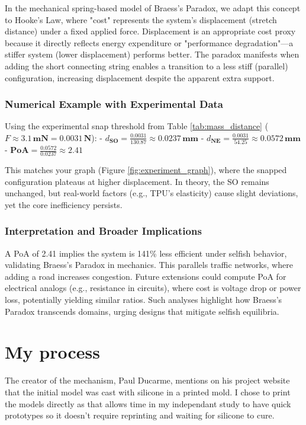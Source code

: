\documentclass[twocolumn]{article}
\begin{document}
In the mechanical spring-based model of Braess's Paradox, we adapt this concept to Hooke's Law, where "cost" represents the system's displacement (stretch distance) under a fixed applied force. Displacement is an appropriate cost proxy because it directly reflects energy expenditure or "performance degradation"—a stiffer system (lower displacement) performs better. The paradox manifests when adding the short connecting string enables a transition to a less stiff (parallel) configuration, increasing displacement despite the apparent extra support.


\subsubsection{Numerical Example with Experimental Data}
Using the experimental snap threshold from Table \ref{tab:mass_distance} (\(F \approx 3.1 \, \textbf{mN} = 0.0031 \, \textbf{N}\)):
- \(d_{\textbf{SO}} = \frac{0.0031}{130.87} \approx 0.0237 \, \textbf{mm}\)
- \(d_{\textbf{NE}} = \frac{0.0031}{54.25} \approx 0.0572 \, \textbf{mm}\)
- \(\textbf{PoA} = \frac{0.0572}{0.0237} \approx 2.41\)

This matches your graph (Figure \ref{fig:experiment_graph}), where the snapped configuration plateaus at higher displacement. In theory, the SO remains unchanged, but real-world factors (e.g., TPU's elasticity) cause slight deviations, yet the core inefficiency persists.

\subsubsection{Interpretation and Broader Implications}
A PoA of 2.41 implies the system is 141\% less efficient under selfish behavior, validating Braess's Paradox in mechanics. This parallels traffic networks, where adding a road increases congestion. Future extensions could compute PoA for electrical analogs (e.g., resistance in circuits), where cost is voltage drop or power loss, potentially yielding similar ratios. Such analyses highlight how Braess's Paradox transcends domains, urging designs that mitigate selfish equilibria.

\section{My process}

The creator of the mechanism, Paul Ducarme, mentions on his project website that the initial model was cast with silicone in a printed mold. I chose to print the models directly as that allows time in my independant study to have quick prototypes so it doesn't require reprinting and waiting for silicone to cure.
\end{document}
